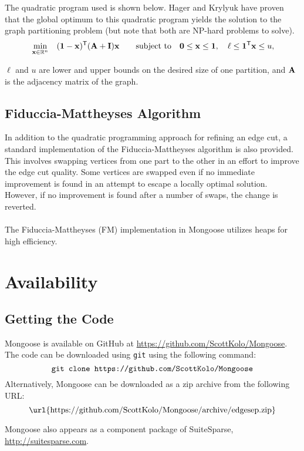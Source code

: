 \documentclass[letter]{article}
\newcommand{\mb}[1]{{\bf{#1}}}
\newcommand{\tr}{^{\sf T}}
\begin{document}
The quadratic program used is shown below. Hager and Krylyuk have proven that the global optimum to this quadratic program yields the solution to the graph partitioning problem (but note that both are NP-hard problems to solve).
%
\begin{eqnarray}
&\displaystyle\min_{\mb{x}\in\mathbb{R}^n}\quad  (\mb{1} - \mb{x})\tr (\mb{A} + \mb{I})\mb{x}
& \quad \mbox{subject to}  \quad
\mb{0} \le \mb{x} \le \mb{1}, \quad \ell \le \mb{1}\tr \mb{x} \le u, \nonumber
\end{eqnarray}

$\ell$ and $u$ are lower and upper bounds on the desired size of one partition, and $\mb{A}$ is the adjacency matrix of the graph.

\subsection{Fiduccia-Mattheyses Algorithm}

In addition to the quadratic programming approach for refining an edge cut, a standard implementation of the Fiduccia-Mattheyses algorithm \cite{FiducciaMattheyses1982} is also provided. This involves swapping vertices from one part to the other in an effort to improve the edge cut quality. Some vertices are swapped even if no immediate improvement is found in an attempt to escape a locally optimal solution. However, if no improvement is found after a number of swaps, the change is reverted.\\
\\
The Fiduccia-Mattheyses (FM) implementation in Mongoose utilizes heaps for high efficiency. 

\section{Availability}

\subsection{Getting the Code}
Mongoose is available on GitHub at \url{https://github.com/ScottKolo/Mongoose}. The code can be downloaded using \texttt{git} using the following command:
\[\text{\texttt{git clone https://github.com/ScottKolo/Mongoose}}\]
Alternatively, Mongoose can be downloaded as a zip archive from the following URL:
\[\text{\url{https://github.com/ScottKolo/Mongoose/archive/edgesep.zip}}\] 

Mongoose also appears as a component package of SuiteSparse, \url{http://suitesparse.com}.
\end{document}
